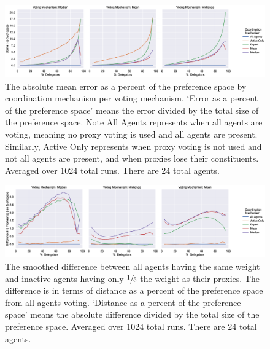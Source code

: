 \begin{landscape}
    \begin{figure}[p]
        \centering
        \includegraphics[scale=0.55]
        {content/chapter2/figures/vm_col_cm_hue_error_as_percent_of_space_abs_mean}
        \caption{
            The absolute mean error as a percent of the preference space by
            coordination mechanism per voting mechanism.
            `Error as a percent of the preference space' means the error divided by
            the total size of the preference space.
            Note All Agents represents when all agents are voting, meaning no proxy
            voting is used and all agents are present.
            Similarly, Active Only represents when proxy voting is not used and not
            all agents are present, and when proxies lose their constituents.
            Averaged over 1024 total runs.
            There are 24 total agents.
        }
        \label{fig:vm-col-cm-hue-error-as-percent-of-space-abs-mean}
    \end{figure}

    \begin{figure}[p]
        \centering
        \includegraphics[scale=0.55]
        {content/chapter2/figures/different_weight/difference_abs_pref_percent_of_space_smoothed}
        \caption{
            The smoothed difference between all agents having the same weight and
            inactive agents having only $\sfrac{1}{5}$ the weight as their proxies.
            The difference is in terms of distance as a percent of the preference
            space from all agents voting.
            `Distance as a percent of the preference space' means the absolute
            difference divided by the total size of the preference space.
            Averaged over 1024 total runs.
            There are 24 total agents.
        }
        \label{fig:different-weight-comparison}
    \end{figure}
\end{landscape}

